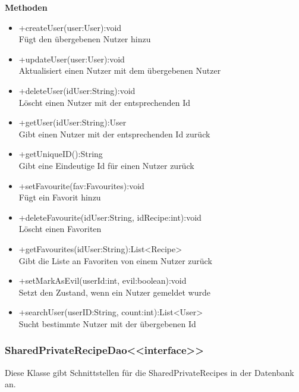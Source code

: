 \textbf{Methoden}
\begin{itemize}
	\item +createUser(user:User):void \\Fügt den übergebenen Nutzer hinzu
	\item +updateUser(user:User):void \\Aktualisiert einen Nutzer mit dem übergebenen Nutzer
	\item +deleteUser(idUser:String):void \\Löscht einen Nutzer mit der entsprechenden Id
	\item +getUser(idUser:String):User \\Gibt einen Nutzer mit der entsprechenden Id zurück
	\item +getUniqueID():String \\Gibt eine Eindeutige Id für einen Nutzer zurück
	\item +setFavourite(fav:Favourites):void \\Fügt ein Favorit hinzu
	\item +deleteFavourite(idUser:String, idRecipe:int):void \\Löscht einen Favoriten
	\item +getFavourites(idUser:String):List<Recipe> \\Gibt die Liste an Favoriten von einem Nutzer zurück
	\item +setMarkAsEvil(userId:int, evil:boolean):void \\Setzt den Zustand, wenn ein Nutzer gemeldet wurde
	\item +searchUser(userID:String, count:int):List<User> \\Sucht bestimmte Nutzer mit der übergebenen Id
\end{itemize}

\subsubsection{SharedPrivateRecipeDao<<interface>>}
Diese Klasse gibt Schnittstellen für die SharedPrivateRecipes in der Datenbank an.

